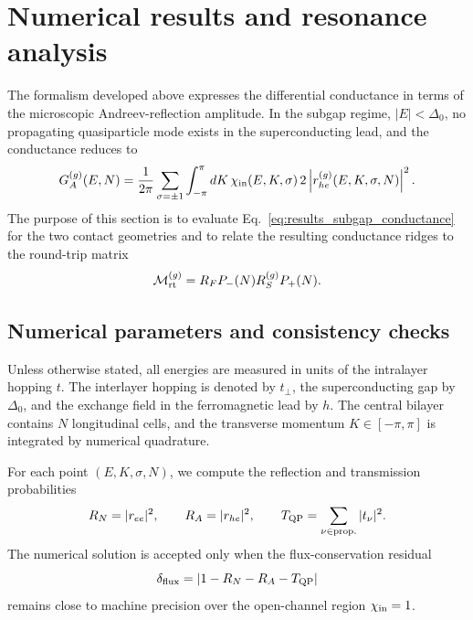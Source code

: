 \section{Numerical results and resonance analysis}
\label{sec:results}

The formalism developed above expresses the differential conductance in
terms of the microscopic Andreev-reflection amplitude.  In the subgap
regime, \(|E|<\Delta_0\), no propagating quasiparticle mode exists in the
superconducting lead, and the conductance reduces to
\begin{equation}
	G_A^{(g)}(E,N)
	=
	\frac{1}{2\pi}
	\sum_{\sigma=\pm1}
	\int_{-\pi}^{\pi}
	dK\,
	\chi_{\rm in}(E,K,\sigma)\,
	2
	\left|
	r_{he}^{(g)}(E,K,\sigma,N)
	\right|^2 .
	\label{eq:results_subgap_conductance}
\end{equation}
The purpose of this section is to evaluate Eq.~\eqref{eq:results_subgap_conductance}
for the two contact geometries and to relate the resulting conductance
ridges to the round-trip matrix
\begin{equation}
	\mathcal M_{\rm rt}^{(g)}
	=
	R_F P_-(N) R_S^{(g)} P_+(N).
	\label{eq:results_round_trip_matrix}
\end{equation}

\subsection{Numerical parameters and consistency checks}
\label{subsec:numerical_parameters}

Unless otherwise stated, all energies are measured in units of the
intralayer hopping \(t\).  The interlayer hopping is denoted by \(t_\perp\),
the superconducting gap by \(\Delta_0\), and the exchange field in the
ferromagnetic lead by \(h\).  The central bilayer contains \(N\) longitudinal
cells, and the transverse momentum \(K\in[-\pi,\pi]\) is integrated by
numerical quadrature.

For each point \((E,K,\sigma,N)\), we compute the reflection and transmission
probabilities
\begin{equation}
	R_N=
	|r_{ee}|^2,
	\qquad
	R_A=
	|r_{he}|^2,
	\qquad
	T_{\rm QP}
	=
	\sum_{\nu\in{\rm prop.}}
	|t_\nu|^2 .
\end{equation}
The numerical solution is accepted only when the flux-conservation residual
\begin{equation}
	\delta_{\rm flux}
	=
	\left|
	1-R_N-R_A-T_{\rm QP}
	\right|
	\label{eq:flux_residual}
\end{equation}
remains close to machine precision over the open-channel region
\(\chi_{\rm in}=1\).

